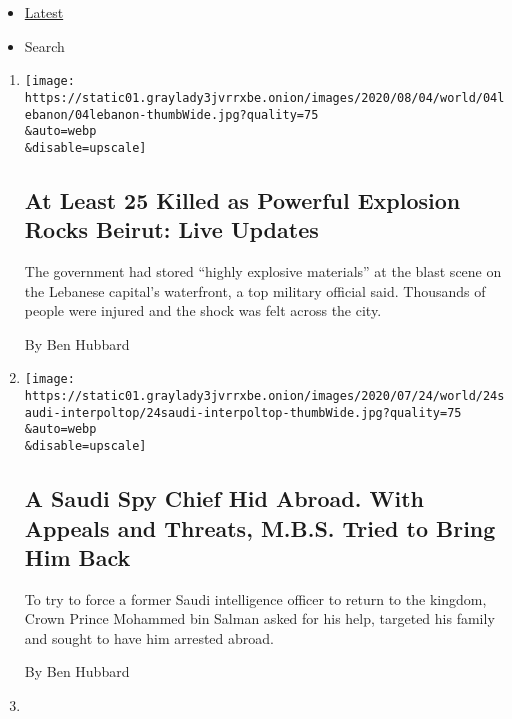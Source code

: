 \begin{itemize}
\tightlist
\item
  \protect\hyperlink{stream-panel}{Latest}
\item
  Search
\end{itemize}

\begin{enumerate}
\def\labelenumi{\arabic{enumi}.}
\item
  \href{/2020/08/04/world/middleeast/beirut-explosion-blast.html}{}

  \texttt{[image: https://static01.graylady3jvrrxbe.onion/images/2020/08/04/world/04lebanon/04lebanon-thumbWide.jpg?quality=75\\\&auto=webp\\\&disable=upscale]}

  \hypertarget{at-least-25-killed-as-powerful-explosion-rocks-beirut-live-updates}{%
  \subsection{At Least 25 Killed as Powerful Explosion Rocks Beirut:
  Live
  Updates}\label{at-least-25-killed-as-powerful-explosion-rocks-beirut-live-updates}}

  The government had stored ``highly explosive materials'' at the blast
  scene on the Lebanese capital's waterfront, a top military official
  said. Thousands of people were injured and the shock was felt across
  the city.

  By Ben Hubbard
\item
  \href{/2020/07/24/world/middleeast/Saudi-spy-mbs-extradition.html}{}

  \texttt{[image: https://static01.graylady3jvrrxbe.onion/images/2020/07/24/world/24saudi-interpoltop/24saudi-interpoltop-thumbWide.jpg?quality=75\\\&auto=webp\\\&disable=upscale]}

  \hypertarget{a-saudi-spy-chief-hid-abroad-with-appeals-and-threats-mbs-tried-to-bring-him-back}{%
  \subsection{A Saudi Spy Chief Hid Abroad. With Appeals and Threats,
  M.B.S. Tried to Bring Him
  Back}\label{a-saudi-spy-chief-hid-abroad-with-appeals-and-threats-mbs-tried-to-bring-him-back}}

  To try to force a former Saudi intelligence officer to return to the
  kingdom, Crown Prince Mohammed bin Salman asked for his help, targeted
  his family and sought to have him arrested abroad.

  By Ben Hubbard
\item
  \href{/2020/07/12/world/middleeast/beirut-lebanon-economic-crisis.html}{}


\end{enumerate}
